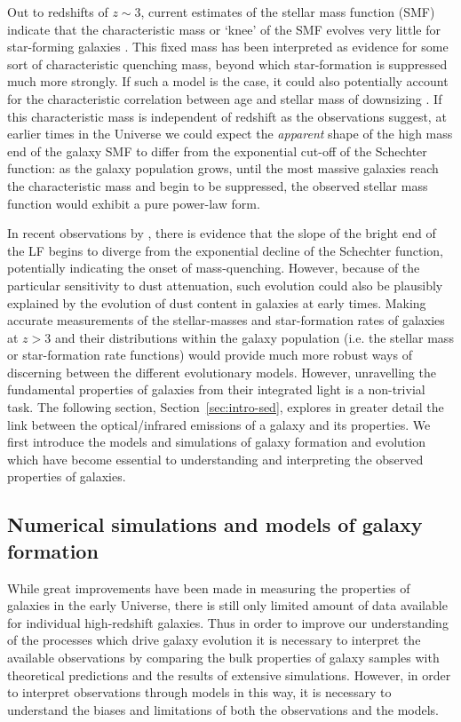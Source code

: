 Out to redshifts of $z\sim3$, current estimates of the stellar mass function (SMF) indicate that the characteristic mass or `knee' of the SMF evolves very little for star-forming galaxies \citep{Ilbert:2013dq,Muzzin:2013bl}. This fixed mass has been interpreted as evidence for some sort of characteristic quenching mass, beyond which star-formation is suppressed much more strongly. If such a model is the case, it could also potentially account for the characteristic correlation between age and stellar mass of downsizing \citep{Peng:2010gn}. If this characteristic mass is independent of redshift as the observations suggest, at earlier times in the Universe we could expect the \emph{apparent} shape of the high mass end of the galaxy SMF to differ from the exponential cut-off of the Schechter function: as the galaxy population grows, until the most massive galaxies reach the characteristic mass and begin to be suppressed, the observed stellar mass function would exhibit a pure power-law form.

In recent observations by \citet{Bowler:2013wz}, there is evidence that the slope of the bright end of the LF begins to diverge from the exponential decline of the Schechter function, potentially indicating the onset of mass-quenching. However, because of the particular sensitivity to dust attenuation, such evolution could also be plausibly explained by the evolution of dust content in galaxies at early times. Making accurate measurements of the stellar-masses and star-formation rates of galaxies at $z > 3$ and their distributions within the galaxy population (i.e. the stellar mass or star-formation rate functions) would provide much more robust ways of discerning between the different evolutionary models. However, unravelling the fundamental properties of galaxies from their integrated light is a non-trivial task. The following section, Section~\ref{sec:intro-sed}, explores in greater detail the link between the optical/infrared emissions of a galaxy and its properties. We first introduce the models and simulations of galaxy formation and evolution which have become essential to understanding and interpreting the observed properties of galaxies.

\subsection{Numerical simulations and models of galaxy formation}
While great improvements have been made in measuring the properties of galaxies in the early Universe, there is still only limited amount of data available for individual high-redshift galaxies. Thus in order to improve our understanding of the processes which drive galaxy evolution it is necessary to interpret the available observations by comparing the bulk properties of galaxy samples with theoretical predictions and the results of extensive simulations. However, in order to interpret observations through models in this way, it is necessary to understand the biases and limitations of both the observations and the models.

